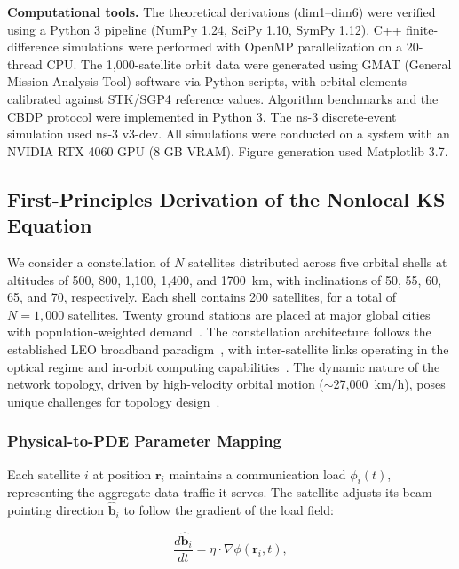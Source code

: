 \documentclass[sn-nature,pdflatex]{sn-jnl}
\begin{document}
\textbf{Computational tools.} The theoretical derivations (dim1--dim6) were verified using a Python 3 pipeline (NumPy 1.24, SciPy 1.10, SymPy 1.12). C++ finite-difference simulations were performed with OpenMP parallelization on a 20-thread CPU. The 1,000-satellite orbit data were generated using GMAT (General Mission Analysis Tool) software via Python scripts, with orbital elements calibrated against STK/SGP4 reference values. Algorithm benchmarks and the CBDP protocol were implemented in Python 3. The ns-3 discrete-event simulation used ns-3 v3-dev. All simulations were conducted on a system with an NVIDIA RTX 4060 GPU (8 GB VRAM). Figure generation used Matplotlib 3.7.

\subsection{First-Principles Derivation of the Nonlocal KS Equation}
\label{sec:first_principles}

We consider a constellation of $N$ satellites distributed across five orbital shells at altitudes of 500, 800, 1,100, 1,400, and \SI{1700}{\km}, with inclinations of 50\degree, 55\degree, 60\degree, 65\degree, and 70\degree, respectively.
Each shell contains 200 satellites, for a total of $N=1,000$ satellites.
Twenty ground stations are placed at major global cities with population-weighted demand~\cite{kodheli_2021}.
The constellation architecture follows the established LEO broadband paradigm~\cite{su_2019,leyva_mayorga_2020,chaudhry_2020}, with inter-satellite links operating in the optical regime and in-orbit computing capabilities~\cite{bhattacherjee_2020}. The dynamic nature of the network topology, driven by high-velocity orbital motion ($\sim$27,000~km/h), poses unique challenges for topology design~\cite{bhattacherjee_2019}.

\subsubsection{Physical-to-PDE Parameter Mapping}

Each satellite $i$ at position $\mathbf{r}_i$ maintains a communication load $\phi_i(t)$, representing the aggregate data traffic it serves.
The satellite adjusts its beam-pointing direction $\hat{\mathbf{b}}_i$ to follow the gradient of the load field:

\begin{equation}
\frac{d\hat{\mathbf{b}}_i}{dt} = \eta \cdot \nabla \phi(\mathbf{r}_i, t),
\end{equation}
\end{document}
